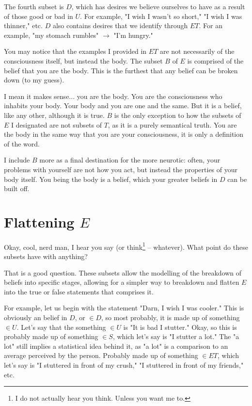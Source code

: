 \documentclass{article}
\begin{document}
The fourth subset is $D$, which has desires we believe ourselves to have as a
result of those good or bad in $U$. For example, "I wish I wasn't so short," "I
wish I was thinner," etc. $D$ also contains desires that we identify through
$ET$. For an example, "my stomach rumbles" $\to$ "I'm hungry."

You may notice that the examples I provided in $ET$ are not necessarily of the
consciousness itself, but instead the body. The subset $B$ of $E$ is comprised
of the belief that you are the body. This is the furthest that any belief can be
broken down (to my guess).

I mean it makes sense... you are the body. You are the consciousness who
inhabits your body. Your body and you are one and the same. But it is a belief,
like any other, although it is true. $B$ is the only exception to how the
subsets of $E$ I designated are not subsets of $T$, as it is a purely semantical
truth. You are the body in the same way that you are your consciousness, it is
only a definition of the word.

I include $B$ more as a final destination for the more neurotic: often, your
problems with yourself are not how you act, but instead the properties of your
body itself. You being the body is a belief, which your greater beliefs in $D$
can be built off.

\section{Flattening $E$}

Okay, cool, nerd man, I hear you say (or think\footnote{I do not actually
hear you think. Unless you want me to.} -- whatever). What point do these
subsets have with anything?

That is a good question. These subsets allow the modelling of the breakdown of
beliefs into specific stages, allowing for a simpler way to breakdown and
flatten $E$ into the true or false statements that comprises it.

For example, let us begin with the statement "Darn, I wish I was cooler." This
is obviously an belief in $D$, or $\in D$, so most probably, it is made up of
something $\in U$. Let's say that the something $\in U$ is "It is bad I
stutter." Okay, so this is probably made up of something $\in S$, which let's
say is "I stutter a lot." The "a lot" still implies a statistical idea behind
it, as "a lot" is a comparison to an average perceived by the person. Probably
made up of something $\in ET$, which let's say is "I stuttered in front of my
crush," "I stuttered in front of my friends," etc.
\end{document}

